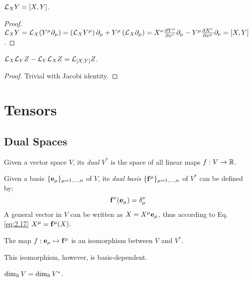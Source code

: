 \begin{proposition}
  $ \mathcal{L}_X Y = \left[ X,Y \right] $.
\end{proposition}
\begin{proof}
  $ \mathcal{L}_X Y = \mathcal{L}_X (Y^{\mu} \partial_{\mu}) = \left( \mathcal{L}_X Y^{\mu} \right) \partial_{\mu} + Y^{\mu} \left( \mathcal{L}_X \partial_{\mu} \right) = X^{\nu} \frac{\partial Y^{\mu}}{\partial x^{\nu}} \partial_{\mu} - Y^{\mu} \frac{\partial X^{\nu}}{\partial x^{\mu}} \partial_{\nu} = \left[ X,Y \right] $.
\end{proof}
\begin{proposition}\label{prop-lie-algebra}
  $ \mathcal{L}_X \mathcal{L}_Y Z - \mathcal{L}_Y \mathcal{L}_X Z = \mathcal{L}_{\left[ X,Y \right]} Z $.
\end{proposition}
\begin{proof}
  Trivial with Jacobi identity.
\end{proof}

\section{Tensors}

\subsection{Dual Spaces}

\begin{definition}
  Given a vector space $ V $, its \textit{dual} $ V^* $ is the space of all linear maps $ f : V \rightarrow \mathbb{R} $.
\end{definition}

Given a basis $ \{\mathbf{e}_{\mu}\}_{\mu = 1,\dots,n} $ of $ V $, its \textit{dual basis} $ \{\mathbf{f}^{\mu}\}_{\mu=1,\dots,n} $ of $ V^* $ can be defined by:
\begin{equation}
  \mathbf{f}^{\nu}(\mathbf{e}_{\mu}) = \delta^{\nu}_{\mu}
  \label{eq:2.17}
\end{equation}
A general vector in $ V $ can be written as $ X = X^{\mu} \mathbf{e}_{\mu} $, thus according to Eq. \ref{eq:2.17} $ X^{\mu} = \mathbf{f}^{\mu}(X) $.

\begin{proposition}
  The map $ f : \mathbf{e}_{\mu} \mapsto \mathbf{f}^{\mu} $ is an isomorphism between $ V $ and $ V^* $.
\end{proposition}

This isomorphism, however, is basis-dependent.

\begin{proposition}
  $ \dim_{\mathbb{R}}V = \dim_{\mathbb{R}}V^* $.
\end{proposition}

